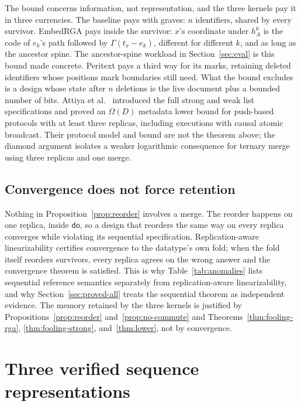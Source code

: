 The bound concerns information, not representation, and the three kernels
pay it in three currencies. The baseline pays with graves: $n$ identifiers,
shared by every survivor. EmbedRGA pays inside the survivor: $x$'s coordinate
under $h^k_A$ is the code of $e_k$'s path followed by $\Gamma(t_x-e_k)$,
different for different $k$, and as long as the ancestor spine. The
ancestor-spine workload in Section~\ref{sec:eval} is this bound made
concrete. Peritext pays a third way for its marks, retaining deleted
identifiers whose positions mark boundaries still need. What the bound
excludes is a design whose state after $n$ deletions is the live document
plus a bounded number of bits. Attiya et al.~\cite{attiya2016list} introduced
the full strong and weak list specifications and proved an $\Omega(D)$
metadata lower bound for push-based protocols with at least three replicas,
including executions with causal atomic broadcast. Their protocol model and
bound are not the theorem above; the diamond argument isolates a weaker
logarithmic consequence for ternary merge using three replicas and one merge.

\subsection{Convergence does not force retention}
\label{sec:convergence-not-enough}

Nothing in Proposition~\ref{prop:reorder} involves a merge. The reorder
happens on one replica, inside $\mathsf{do}$, so a design that reorders the
same way on every replica converges while violating its sequential
specification. Replication-aware linearizability certifies convergence to
the datatype's own fold; when the fold itself reorders survivors, every
replica agrees on the wrong answer and the convergence theorem is satisfied.
This is why Table~\ref{tab:anomalies} lists sequential reference semantics
separately from replication-aware linearizability, and why
Section~\ref{sec:proved-all} treats the sequential theorem as independent
evidence. The memory retained by the three kernels is justified by
Propositions~\ref{prop:reorder} and~\ref{prop:no-commute} and
Theorems~\ref{thm:fooling-rga}, \ref{thm:fooling-strong},
and~\ref{thm:lower}, not by convergence.

\section{Three verified sequence representations}

